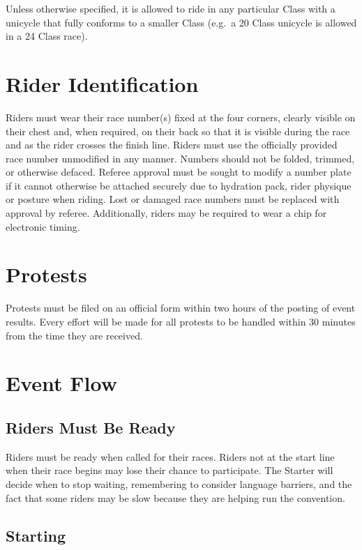 Unless otherwise specified, it is allowed to ride in any particular Class with a unicycle that fully conforms to a smaller Class
(e.g.\ a 20 Class unicycle is allowed in a 24 Class race).

\section{Rider Identification}

Riders must wear their race number(s) fixed at the four corners, clearly visible on their chest and, when required, on their back so that it is visible during the race and as the rider crosses the finish line.
Riders must use the officially provided race number unmodified in any manner.
Numbers should not be folded, trimmed, or otherwise defaced.
Referee approval must be sought to modify a number plate if it cannot otherwise be attached securely due to hydration pack, rider physique or posture when riding.
Lost or damaged race numbers must be replaced with approval by referee.
Additionally, riders may be required to wear a chip for electronic timing.

\section{Protests}

Protests must be filed on an official form within two hours of the posting of event results.
Every effort will be made for all protests to be handled within 30 minutes from the time they are received.

\section{Event Flow}

\subsection{Riders Must Be Ready}

Riders must be ready when called for their races.
Riders not at the start line when their race begins may lose their chance to participate.
The Starter will decide when to stop waiting, remembering to consider language barriers, and the fact that some riders may be slow because they are helping run the convention.

\subsection{Starting}

